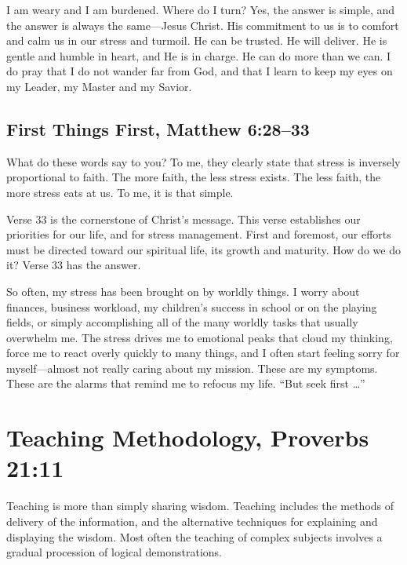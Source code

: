 \documentclass[12pt]{memoir}
\begin{document}
I am weary and I am burdened. Where do I turn? Yes, the answer is
simple, and the answer is always the same---Jesus Christ. His commitment
to us is to comfort and calm us in our stress and turmoil. He can
be trusted. He will deliver. He is gentle and humble in heart, and
He is in charge. He can do more than we can. I do pray that I do not
wander far from God, and that I learn to keep my eyes on my Leader,
my Master and my Savior. 

\subsection[First Things First]{First Things First, Matthew 6:28--33}

What do these words say to you? To me, they clearly state that stress
is inversely proportional to faith. The more faith, the less stress
exists. The less faith, the more stress eats at us. To me, it is that
simple.

Verse 33 is the cornerstone of Christ's message. This verse establishes
our priorities for our life, and for stress management. First and
foremost, our efforts must be directed toward our spiritual life,
its growth and maturity. How do we do it? Verse 33 has the answer.

So often, my stress has been brought on by worldly things. I worry about finances, business workload, my children's success in school
or on the playing fields, or simply accomplishing all of the many
worldly tasks that usually overwhelm me. The stress drives me to emotional
peaks that cloud my thinking, force me to react overly quickly to
many things, and I often start feeling sorry for myself---almost
not really caring about my mission. These are my symptoms. These are
the alarms that remind me to refocus my life. ``But seek first \dots''

\section[Teaching Methodology]{Teaching Methodology, Proverbs 21:11}

Teaching is more than simply sharing wisdom. Teaching includes the methods of delivery of the information, and the alternative techniques for explaining and displaying the wisdom. Most often the teaching of complex subjects involves a gradual procession of logical demonstrations. 
\end{document}
